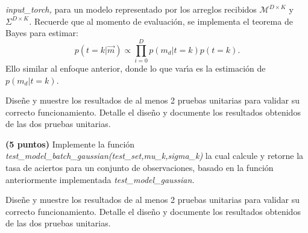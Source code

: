 \documentclass[spanish]{article}
\begin{document}
\begin{myEnumerate}
\begin{myEnumerate}
\begin{myEnumerate}
\emph{input\_torch, }para un modelo representado por los arreglos
recibidos \emph{$\mathcal{M}^{D\times K}$ }y\emph{ $\Sigma^{D\times K}$.}
Recuerde que al momento de evaluaci\'{o}n, se implementa el teorema
de Bayes para estimar:
\[
p\left(t=k|\overrightarrow{m}\right)\propto\prod_{i=0}^{D}p\left(m_{d}|t=k\right)p\left(t=k\right).
\]
Ello similar al enfoque anterior, donde lo que var\'{\i}a es la estimaci\'{o}n
de $p\left(m_{d}|t=k\right)$.
\begin{myEnumerate}
\item Dise\~{n}e y muestre los resultados de al menos 2 pruebas unitarias
para validar su correcto funcionamiento. Detalle el dise\~{n}o y documente
los resultados obtenidos de las dos pruebas unitarias.
\end{myEnumerate}
\item \textbf{(5 puntos)} Implemente la funci\'{o}n \emph{test\_model\_batch\_gaussian(test\_set,mu\_k,sigma\_k)
}la cual calcule y retorne la tasa de aciertos para un conjunto de
observaciones, basado en la funci\'{o}n anteriormente implementada
\emph{test\_model\_gaussian.}
\begin{myEnumerate}
\item Dise\~{n}e y muestre los resultados de al menos 2 pruebas unitarias
para validar su correcto funcionamiento. Detalle el dise\~{n}o y documente
los resultados obtenidos de las dos pruebas unitarias.
\end{myEnumerate}
\end{myEnumerate}
\end{myEnumerate}


\end{myEnumerate}
\end{document}
